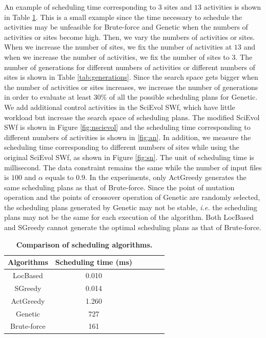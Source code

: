 An example of scheduling time corresponding to $3$ sites and $13$ activities is shown in Table \ref{tab:MST}. This is a small example since the time necessary to schedule the activities may be unfeasible for Brute-force and Genetic when the numbers of activities or sites become high. Then, we vary the numbers of activities or sites. When we increase the number of sites, we fix the number of activities at $13$ and when we increase the number of activities, we fix the number of sites to $3$. The number of generations for different numbers of activities or different numbers of sites is shown in Table \ref{tab:generations}. Since the search space gets bigger when the number of activities or sites increases, we increase the number of generations in order to evaluate at least $30\%$ of all the possible scheduling plans for Genetic. We add additional control activities in the SciEvol SWf, which have little workload but increase the search space of scheduling plans. The modified SciEvol SWf is shown in Figure \ref{fig:nscievol} and the scheduling time corresponding to different numbers of activities is shown in \ref{fig:an}. In addition, we measure the scheduling time corresponding to different numbers of sites while using the original SciEvol SWf, as shown in Figure \ref{fig:sn}. 
The unit of scheduling time is millisecond.
The data constraint remains the same while the number of input files is $100$ and $\alpha$ equals to $0.9$. In the experiments, only ActGreedy generates the same scheduling plans as that of Brute-force. Since the point of mutation operation and the points of crossover operation of Genetic are randomly selected, the scheduling plans generated by Genetic may not be stable, \textit{i.e.} the scheduling plans may not be the same for each execution of the algorithm. Both LocBased and SGreedy cannot generate the optimal scheduling plans as that of Brute-force.

\begin{table}[htbp]
\caption{\textbf{Comparison of scheduling algorithms. }}
\label{tab:MST}
\begin{centering}
\captionsetup{justification=centering}
\begin{tabular}{|c|c|c|c|c|c|}
\hline
Algorithms & Scheduling time (ms) \tabularnewline
\hline
LocBased & 0.010 \tabularnewline
\hline
SGreedy & 0.014 \tabularnewline
\hline
ActGreedy & 1.260 \tabularnewline
\hline
Genetic & 727 \tabularnewline
\hline
Brute-force & 161 \tabularnewline
\hline
\end{tabular}
\par\end{centering}
\end{table}

